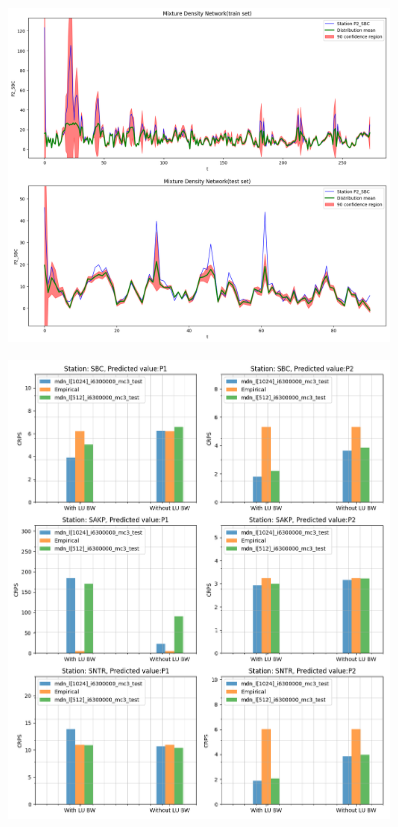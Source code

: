 \documentclass[12pt,a4paper,twoside]{scrartcl}
\numberwithin{equation}{section}
\begin{document}
\begin{center}
  \begin{figure}[htbp]
    \centering
    \includegraphics[height=0.75\textwidth, width=0.9\textwidth]{figures/mdn_1d}
    \caption[MDN one day plot]{}\label{fig:mdn-1d-plot}
  \end{figure}
\end{center}

\begin{center}
  \begin{figure}[htbp]
    \centering
    \includegraphics[height=0.75\textwidth, width=0.9\textwidth]{figures/results_plot_CRPS_1d}
    \caption[CRPS one day results]{}\label{fig:crps-1d}
  \end{figure}
\end{center}
\end{document}
